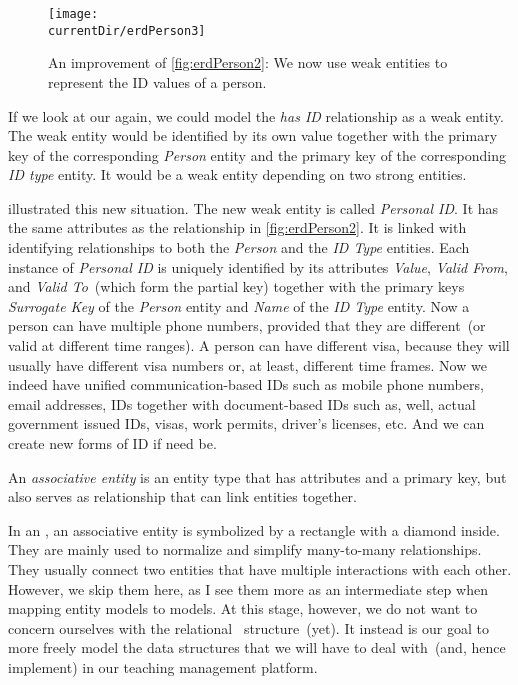 \begin{figure}%
\centering%
\texttt{[image: \\currentDir/erdPerson3]}%
\caption{An improvement of \cref{fig:erdPerson2}: We now use weak entities to represent the ID values of a person.}%
\label{fig:erdPerson3}%
\end{figure}%
%
If we look at our  again, we could model the \emph{has ID} relationship as a weak entity.
The weak entity would be identified by its own value together with the primary key of the corresponding \emph{Person} entity and the primary key of the corresponding \emph{ID type} entity.
It would be a weak entity depending on two strong entities.

 illustrated this new situation.
The new weak entity is called \emph{Personal ID}.
It has the same attributes as the relationship in \cref{fig:erdPerson2}.
It is linked with identifying relationships to both the \emph{Person} and the \emph{ID Type} entities.
Each instance of \emph{Personal ID} is uniquely identified by its attributes \emph{Value}, \emph{Valid From}, and \emph{Valid To}~(which form the partial key) together with the primary keys \emph{Surrogate Key} of the \emph{Person} entity and \emph{Name} of the \emph{ID Type} entity.
Now a person can have multiple phone numbers, provided that they are different~(or valid at different time ranges).
A person can have different visa, because they will usually have different visa numbers or, at least, different time frames.
Now we indeed have unified communication-based IDs such as mobile phone numbers, email addresses,  IDs together with document-based IDs such as, well, actual government issued IDs, visas, work permits, driver's licenses, etc.
And we can create new forms of ID if need be.%
%
\begin{definition}%
An \emph{associative entity} is an entity type that has attributes and a primary key, but also serves as relationship that can link entities together.%
\end{definition}%
%
In an , an associative entity is symbolized by a rectangle with a diamond inside.
They are mainly used to normalize and simplify many-to-many relationships.
They usually connect two entities that have multiple interactions with each other.
However, we skip them here, as I see them more as an intermediate step when mapping entity models to  models.
At this stage, however, we do not want to concern ourselves with the relational \db\ structure~(yet).
It instead is our goal to more freely model the data structures that we will have to deal with~(and, hence implement) in our teaching management platform.%
%
\FloatBarrier%
\endhsection%
%
